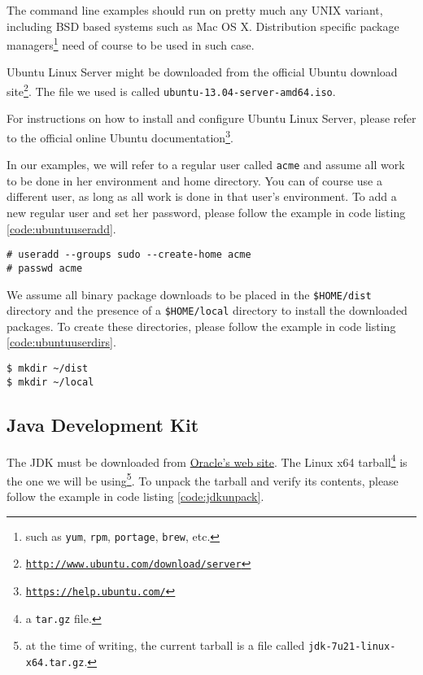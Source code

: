 The command line examples should run on pretty much any UNIX variant,
including \ac{BSD} based systems such as Mac OS X. Distribution specific
package managers\footnote{such as \texttt{yum}, \texttt{rpm},
\texttt{portage}, \texttt{brew}, etc.} need of course to be used in such
case.

Ubuntu Linux Server might be downloaded from the official Ubuntu
download
site\footnote{\href{http://www.ubuntu.com/download/server}{\texttt{http://www.ubuntu.com/download/server}}}.
The file we used is called  \texttt{ubuntu-13.04-server-amd64.iso}.

For instructions on how to install and configure Ubuntu Linux Server,
please refer to the official online Ubuntu
documentation\footnote{\href{https://help.ubuntu.com/}{\texttt{https://help.ubuntu.com/}}}.

In our examples, we will refer to a regular user called \texttt{acme}
and assume all work to be done in her environment and home directory.
You can of course use a different user, as long as all work is done in
that user's environment. To add a new regular user and set her password,
please follow the example in code listing \ref{code:ubuntuuseradd}.

\begin{lstlisting}[label=code:ubuntuuseradd,caption=Adding a regular
user with the \texttt{acme} login]
# useradd --groups sudo --create-home acme
# passwd acme
\end{lstlisting}

We assume all binary package downloads to be placed in the
\texttt{\$HOME/dist} directory and the presence of a
\texttt{\$HOME/local} directory to install the downloaded packages. To
create these directories, please follow the example in code listing
\ref{code:ubuntuuserdirs}.

\begin{lstlisting}[label=code:ubuntuuserdirs,caption=Creating the \texttt{dist} and \texttt{local} directories]
$ mkdir ~/dist
$ mkdir ~/local
\end{lstlisting}

\subsection{Java Development Kit}

The \ac{JDK} must be downloaded from
\href{http://www.oracle.com/technetwork/java/javase/downloads/index.html}{Oracle's
web site}. The Linux x64 tarball\footnote{a \texttt{tar.gz} file.} is
the one we will be using\footnote{at the time of writing, the current
tarball is a file called \texttt{jdk-7u21-linux-x64.tar.gz}.}. To unpack
the tarball and verify its contents, please follow the example in code
listing \ref{code:jdkunpack}.

